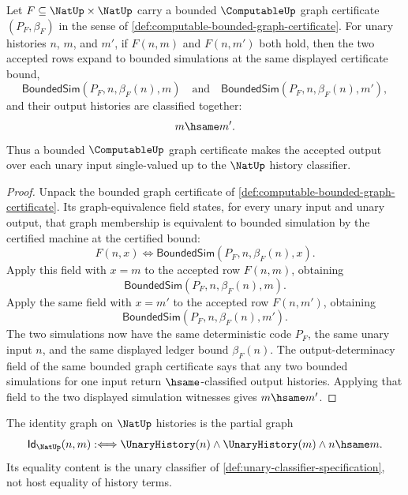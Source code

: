 \begin{theorem}
\label{thm:computable-bounded-graph-single-valuedness}
Let $F\subseteq\NatUp\times\NatUp$ carry a bounded $\ComputableUp$ graph certificate $(P_F,\beta_F)$ in the sense of \autoref{def:computable-bounded-graph-certificate}. For unary histories $n$, $m$, and $m'$, if $F(n,m)$ and $F(n,m')$ both hold, then the two accepted rows expand to bounded simulations at the same displayed certificate bound,
$$
  \mathsf{BoundedSim}(P_F,n,\beta_F(n),m)
  \quad\text{and}\quad
  \mathsf{BoundedSim}(P_F,n,\beta_F(n),m'),
$$
and their output histories are classified together:
$$
  m\hsame m'.
$$
Thus a bounded $\ComputableUp$ graph certificate makes the accepted output over each unary input single-valued up to the $\NatUp$ history classifier.
\end{theorem}
\begin{proof}
Unpack the bounded graph certificate of \autoref{def:computable-bounded-graph-certificate}. Its graph-equivalence field states, for every unary input and unary output, that graph membership is equivalent to bounded simulation by the certified machine at the certified bound:
$$
  F(n,x)\Longleftrightarrow \mathsf{BoundedSim}(P_F,n,\beta_F(n),x).
$$
Apply this field with $x=m$ to the accepted row $F(n,m)$, obtaining
$$
  \mathsf{BoundedSim}(P_F,n,\beta_F(n),m).
$$
Apply the same field with $x=m'$ to the accepted row $F(n,m')$, obtaining
$$
  \mathsf{BoundedSim}(P_F,n,\beta_F(n),m').
$$
The two simulations now have the same deterministic code $P_F$, the same unary input $n$, and the same displayed ledger bound $\beta_F(n)$. The output-determinacy field of the same bounded graph certificate says that any two bounded simulations for one input return $\hsame$-classified output histories. Applying that field to the two displayed simulation witnesses gives $m\hsame m'$.
\end{proof}

\begin{definition}
\label{def:computable-unary-classifier-identity-graph}
The identity graph on $\NatUp$ histories is the partial graph
$$
  \mathsf{Id}_{\NatUp}(n,m)
  :\Longleftrightarrow
  \UnaryHistory(n)\land\UnaryHistory(m)\land n\hsame m.
$$
Its equality content is the unary classifier of \autoref{def:unary-classifier-specification}, not host equality of history terms.
\end{definition}

